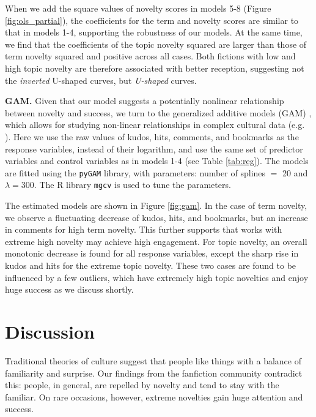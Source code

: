 \documentclass[letterpaper]{article} %
\begin{document}
When we add the square values of novelty scores in models 5-8 (Figure \ref{fig:ols_partial}), the coefficients for the term and novelty scores are similar to that in models 1-4, supporting the robustness of our models. At the same time, we find that the coefficients of the topic novelty squared are larger than those of term novelty squared and positive across all cases. Both fictions with low and high topic novelty are therefore associated with better reception, suggesting not the \emph{inverted} U-shaped curves, but \emph{U-shaped} curves.

\textbf{GAM.} Given that our model suggests a potentially nonlinear relationship between novelty and success, we turn to the generalized additive models (GAM) \cite{wood2006generalized}, which allows for studying non-linear relationships in complex cultural data (e.g. \cite{horvat2018role}). Here we use the raw values of kudos, hits, comments, and bookmarks as the response variables, instead of their logarithm, and use the same set of predictor variables and control variables as in models 1-4 (see Table \ref{tab:reg}).
The models are fitted using the \texttt{pyGAM} library, with parameters: number of splines $=$ 20 and $\lambda = 300$. The R library \texttt{mgcv} is used to tune the parameters. 

The estimated models are shown in Figure \ref{fig:gam}. In the case of term novelty, we observe a fluctuating decrease of kudos, hits, and bookmarks, but an increase in comments for high term novelty. This further supports that works with extreme high novelty may achieve high engagement. For topic novelty, an overall monotonic decrease is found for all response variables, except the sharp rise in kudos and hits for the extreme topic novelty. These two cases are found to be influenced by a few outliers, which have extremely high topic novelties and enjoy huge success as we discuss shortly. 


\section*{Discussion}
Traditional theories of culture suggest that people like things with a balance of familiarity and surprise. Our findings from the fanfiction community contradict this: people, in general, are repelled by  novelty and tend to stay with the familiar. On rare occasions, however, extreme novelties gain huge attention and success.
\end{document}
